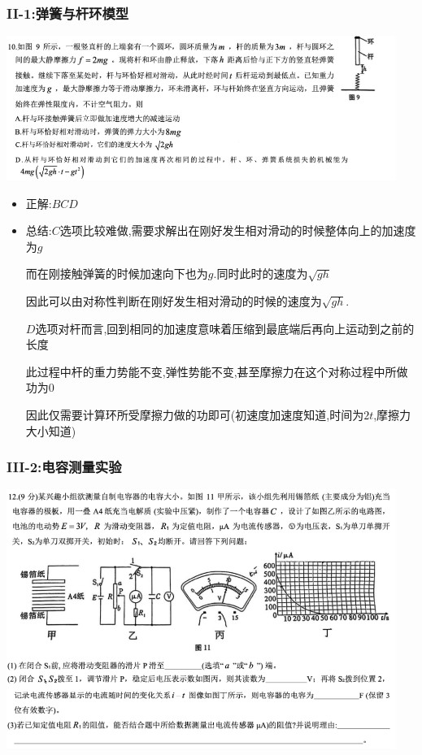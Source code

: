 \documentclass{article}
\begin{document}
\vspace{2em}

\subsubsection{II-1:弹簧与杆环模型}
\includegraphics[width=0.95\textwidth,keepaspectratio]{./pictures/3.3-2.png}

\begin{itemize}
    \item 正解:\quad $BCD$
    \item 总结:\quad $C$选项比较难做,需要求解出在刚好发生相对滑动的时候整体向上的加速度为$g$

          \hspace{3em}\begin{minipage}{0.85\textwidth}
              而在刚接触弹簧的时候加速向下也为$g$.同时此时的速度为$\sqrt{gh}$

              因此可以由对称性判断在刚好发生相对滑动的时候的速度为$\sqrt{gh}$.

              $D$选项对杆而言,回到相同的加速度意味着压缩到最底端后再向上运动到之前的长度

              此过程中杆的重力势能不变,弹性势能不变,甚至摩擦力在这个对称过程中所做功为$0$

              因此仅需要计算环所受摩擦力做的功即可(初速度加速度知道,时间为$2t$,摩擦力大小知道)
          \end{minipage}


\end{itemize}

\vspace{2em}

\subsubsection{III-2:电容测量实验}

\includegraphics[width=0.95\textwidth,keepaspectratio]{./pictures/3.3-4.png}
\end{document}
